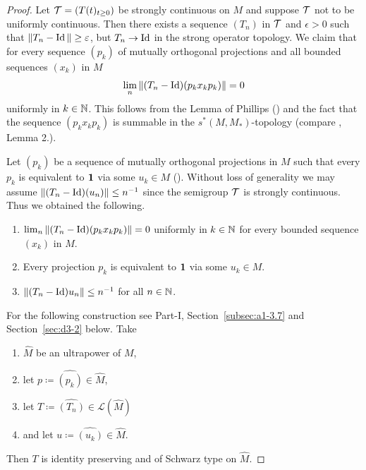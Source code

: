 \begin{proof}
Let $\TT = (T(t)_{t \geq 0})$ be strongly continuous on $M$ and suppose $\mathcal{T}$ not to be uniformly continuous.
Then there exists a sequence $(T_n)$  in  $ \mathcal{T} $ and $\epsilon > 0$ such that $\|T_n - \Id\| \geq \epsilon$, 
but $T_n \to \operatorname{Id}$ in the strong operator topology.
We claim that for every sequence $(p_{k})$ of mutually orthogonal projections and all bounded sequences $(x_{k})$ 
in $M$
\[
\lim_n \|(T_n - \operatorname{Id})(p_{k} x_{k} p_{k})\| = 0
\]
uniformly in $k \in \mathbb{N}$.
This follows from the {Lemma of Phillips} (\textcite[Lemma II.10.3]{schaefer:1974}) and the fact that the sequence $(p_{k} x_{k} p_{k})$ is summable in the $s^{*}(M,M_*)$-topology (compare \textcite{elliot:1972}, Lemma 2.).

Let $(p_{k})$ be a sequence of mutually orthogonal projections in $M$ such that every $p_{k}$ is equivalent to $\mathbf{1}$ via some $u_{k} \in M$ (\textcite[2.2]{sakai:1971}).
Without loss of generality we may assume $\|(T_n - \Id)(u_n)\| \leq n^{-1}$ since the semigroup $\mathcal{T}$ is strongly continuous.
Thus we obtained the following.
\begin{enumerate}[\upshape (i)]
\item 
$\lim_n \|(T_n - \operatorname{Id})(p_{k} x_{k} p_{k})\| = 0$ uniformly in $k \in \mathbb{N}$ for every bounded sequence $(x_{k})$ in $M$.
\item 
Every projection $p_{k}$ is equivalent to $\mathbf{1}$ via some $u_{k} \in M$.
\item 
$\|(T_n - \Id)u_n\| \leq n^{-1}$ for all $n \in \mathbb{N}$.
\end{enumerate}
For the following construction see Part-I, Section~\ref{subsec:a1-3.7} and Section~\ref{sec:d3-2} below.
Take
\begin{enumerate}[\upshape (i)']
\item
$\widehat{M}$ be an ultrapower of\/ $M$,

\item
let $p \coloneq \widehat{(p_{k})} \in \widehat{M}$,

\item
let $T \coloneq \widehat{(T_{n}) }\in \mathcal{L}(\widehat{M})$

\item
and let $u \coloneq \widehat{(u_{k})}  \in \widehat{M}$.

\end{enumerate}
Then $T$ is identity preserving and of Schwarz type on $\widehat{M}$.


\end{proof}

